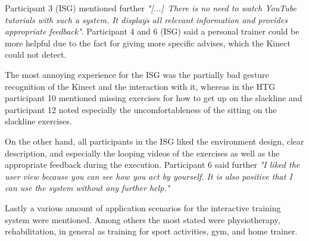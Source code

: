 Participant 3 (ISG) mentioned further \textit{"[...]~There is no need to watch YouTube tutorials with such a system. It displays all relevant information and provides appropriate feedback"}.
Participant 4 and 6 (ISG) said a personal trainer could be more helpful due to the fact for giving more specific advises, which the Kinect could not detect.

The most annoying experience for the ISG was the partially bad gesture recognition of the Kinect and the interaction with it, whereas in the HTG participant 10 mentioned missing exercises for how to get up on the slackline and participant 12 noted especially the uncomfortableness of the sitting on the slackline exercises.

On the other hand, all participants in the ISG liked the environment design, clear description, and especially the looping videos of the exercises as well as the appropriate feedback during the execution.
Participant 6 said further \textit{"I liked the user view because you can see how you act by yourself. It is also positive that I can use the system without any further help."}

Lastly a various amount of application scenarios for the interactive training system were mentioned.
Among others the most stated were physiotherapy, rehabilitation, in general as training for sport activities, gym, and home trainer.


